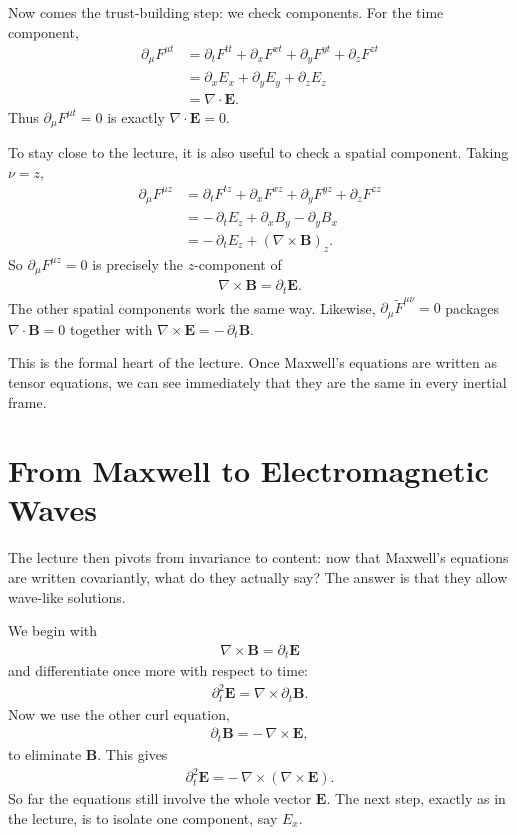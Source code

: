 Now comes the trust-building step: we check components. For the time component,
\begin{align}
\partial_\mu F^{\mu t}
&= \partial_t F^{tt} + \partial_x F^{xt} + \partial_y F^{yt} + \partial_z F^{zt}\\
&= \partial_x E_x + \partial_y E_y + \partial_z E_z\\
&= \nabla \cdot \mathbf E.
\end{align}
Thus \(\partial_\mu F^{\mu t}=0\) is exactly \(\nabla\cdot\mathbf E=0\).

To stay close to the lecture, it is also useful to check a spatial component. Taking \(\nu=z\),
\begin{align}
\partial_\mu F^{\mu z}
&= \partial_t F^{tz} + \partial_x F^{xz} + \partial_y F^{yz} + \partial_z F^{zz}\\
&= -\,\partial_t E_z + \partial_x B_y - \partial_y B_x\\
&= -\,\partial_t E_z + (\nabla \times \mathbf B)_z.
\end{align}
So \(\partial_\mu F^{\mu z}=0\) is precisely the \(z\)-component of
\begin{align}
\nabla \times \mathbf B = \partial_t \mathbf E.
\end{align}
The other spatial components work the same way. Likewise, \(\partial_\mu \tilde F^{\mu\nu}=0\) packages \(\nabla\cdot\mathbf B=0\) together with \(\nabla\times\mathbf E=-\,\partial_t\mathbf B\).

This is the formal heart of the lecture. Once Maxwell's equations are written as tensor equations, we can see immediately that they are the same in every inertial frame.

\section{From Maxwell to Electromagnetic Waves}

The lecture then pivots from invariance to content: now that Maxwell's equations are written covariantly, what do they actually say? The answer is that they allow wave-like solutions.

We begin with
\begin{align}
\nabla \times \mathbf B = \partial_t \mathbf E
\end{align}
and differentiate once more with respect to time:
\begin{align}
\partial_t^2 \mathbf E = \nabla \times \partial_t \mathbf B.
\end{align}
Now we use the other curl equation,
\begin{align}
\partial_t \mathbf B = -\,\nabla \times \mathbf E,
\end{align}
to eliminate \(\mathbf B\). This gives
\begin{align}
\partial_t^2 \mathbf E = -\,\nabla \times (\nabla \times \mathbf E).
\end{align}
So far the equations still involve the whole vector \(\mathbf E\). The next step, exactly as in the lecture, is to isolate one component, say \(E_x\).

